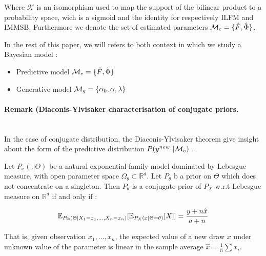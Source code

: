 Where $\mathcal{K}$ is an isomorphism used to map the support of the bilinear product to a probability space, wich is a sigmoid and the identity for respectively ILFM and IMMSB. Furthermore we denote the set of estimated parameters $\mathcal{M}_e = \{\hat F,  \hat \Phi \}$.


In the rest of this paper, we will refers to both context in which we study a Bayesian model :
\begin{itemize}
    \item Predictive model $\mathcal{M}_e = \{\hat F, \hat \Phi\}$
    \item Generative model $\mathcal{M}_g = \{\alpha_0, \alpha, \lambda \}$
\end{itemize}

\paragraph{Remark (Diaconis-Ylvisaker characterisation of conjugate priors.}~\\
In the case of conjugate distribution, the Diaconis-Ylvisaker theorem give insight about the form of the predictive distribution $\p(y^{new} | \M_e)$ \cite{orbanz2009functional}.

\begin{theorem}
Let $P_x(.|\Theta)$ be a natural exponential family model dominated by Lebesgue measure, with open parameter space $\Omega_\theta \subset \mathbb{R}^d$.
    Let $P_\theta$ b a prior on $\Theta$ which does not concentrate on a singleton. Then $P_\theta$ is a  conjugate prior of $P_X$  w.r.t Lebesgue measure on $\mathbb{R}^d$ if and only if :

\begin{equation}
    \mathbb{E}_{P_\Theta(\Theta|X_1=x_1,...,X_n=x_n)} [\mathbb{E}_{P_X(x|\Theta=\theta)}[X]] = \frac{y+n\hat x}{a+n}
\end{equation}

\end{theorem}

That is, given observation $x_1,...,x_n$, the expected value of a new draw $x$ under unknown value of the parameter is linear in the sample average $\hat x = \frac{1}{n}\sum x_i$.

